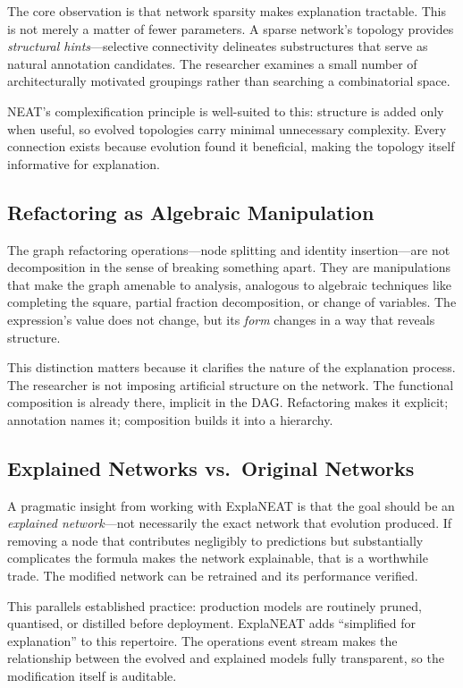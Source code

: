 \documentclass[11pt]{article}
\begin{document}
The core observation is that network sparsity makes explanation tractable. This is not merely a matter of fewer parameters. A sparse network's topology provides \emph{structural hints}---selective connectivity delineates substructures that serve as natural annotation candidates. The researcher examines a small number of architecturally motivated groupings rather than searching a combinatorial space.

NEAT's complexification principle is well-suited to this: structure is added only when useful, so evolved topologies carry minimal unnecessary complexity. Every connection exists because evolution found it beneficial, making the topology itself informative for explanation.

\subsection{Refactoring as Algebraic Manipulation}

The graph refactoring operations---node splitting and identity insertion---are not decomposition in the sense of breaking something apart. They are manipulations that make the graph amenable to analysis, analogous to algebraic techniques like completing the square, partial fraction decomposition, or change of variables. The expression's value does not change, but its \emph{form} changes in a way that reveals structure.

This distinction matters because it clarifies the nature of the explanation process. The researcher is not imposing artificial structure on the network. The functional composition is already there, implicit in the DAG. Refactoring makes it explicit; annotation names it; composition builds it into a hierarchy.

\subsection{Explained Networks vs.\ Original Networks}

A pragmatic insight from working with ExplaNEAT is that the goal should be an \emph{explained network}---not necessarily the exact network that evolution produced. If removing a node that contributes negligibly to predictions but substantially complicates the formula makes the network explainable, that is a worthwhile trade. The modified network can be retrained and its performance verified.

This parallels established practice: production models are routinely pruned, quantised, or distilled before deployment. ExplaNEAT adds ``simplified for explanation'' to this repertoire. The operations event stream makes the relationship between the evolved and explained models fully transparent, so the modification itself is auditable.
\end{document}

